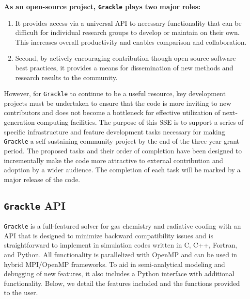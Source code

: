 \documentclass[11pt]{article}
\newcommand{\grackle}{\texttt{Grackle}}
\begin{document}
\begin{flushleft}
\noindent
{\bf As an open-source project, \grackle{} plays two major roles:}
\begin{enumerate}
\item It provides access via a universal API to necessary functionality
that can be difficult for individual research groups to develop or
maintain on their own.  This increases overall productivity and
enables comparison and collaboration.
\item Second, by actively encouraging contribution though open source
  software best practices, it provides a means for dissemination of
  new methods and research results to the community.
\end{enumerate}
However, for \grackle{} to continue to be a useful resource, key
development projects must be undertaken to ensure that the code is
more inviting to new contributors and does not become a bottleneck
for effective utilization of next-generation computing facilities.
The purpose of this SSE is to support a series of specific
infrastructure and feature development tasks necessary for making
\grackle{} a self-sustaining community project by the end of the
three-year grant period.  The proposed tasks and their order of
completion have been designed to incrementally make the code more
attractive to external contribution and adoption by a wider audience.
The completion of each task will be marked by a major release of the
code.

\subsection{\grackle{} API}\label{sec:arch}

\grackle{} is a full-featured solver for gas chemistry and radiative
cooling with an API that is designed to minimize backward
compatibility issues and is straightforward to implement in simulation
codes written in C, C++, Fortran, and Python.  All functionality is
parallelized with OpenMP and can be used in hybrid MPI/OpenMP
frameworks.  To aid in semi-analytical
modeling and debugging of new features, it also includes a Python
interface with additional functionality.  Below, we detail the
features included and the functions provided to the user.


\end{flushleft}
\end{document}
